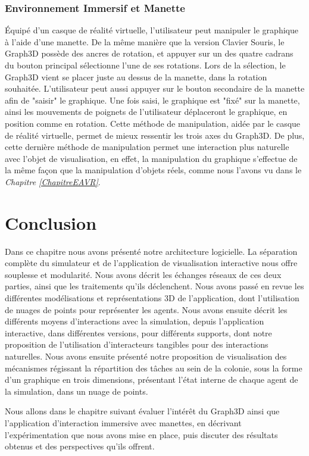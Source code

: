 		\subsubsection{Environnement Immersif et Manette}
		Équipé d'un casque de réalité virtuelle, l'utilisateur peut manipuler le graphique à l'aide d'une manette. De la même manière que la version Clavier Souris, le Graph3D possède des ancres de rotation, et appuyer sur un des quatre cadrans du bouton principal sélectionne l'une de ses rotations. Lors de la sélection, le Graph3D vient se placer juste au dessus de la manette, dans la rotation souhaitée. L'utilisateur peut aussi appuyer sur le bouton secondaire de la manette afin de "saisir" le graphique. Une fois saisi, le graphique est "fixé" sur la manette, ainsi les mouvements de poignets de l'utilisateur déplaceront le graphique, en position comme en rotation. Cette méthode de manipulation, aidée par le casque de réalité virtuelle, permet de mieux ressentir les trois axes du Graph3D. De plus, cette dernière méthode de manipulation permet une interaction plus naturelle avec l'objet de visualisation, en effet, la manipulation du graphique s'effectue de la même façon que la manipulation d'objets réels, comme nous l'avons vu dans le \textit{Chapitre \ref{ChapitreEAVR}}.
		
	
	
			
	\section*{Conclusion}
	Dans ce chapitre nous avons présenté notre architecture logicielle. La séparation complète du simulateur et de l'application de visualisation interactive nous offre souplesse et modularité. Nous avons décrit les échanges réseaux de ces deux parties, ainsi que les traitements qu'ils déclenchent. Nous avons passé en revue les différentes modélisations et représentations 3D de l'application, dont l'utilisation de nuages de points pour représenter les agents. Nous avons ensuite décrit les différents moyens d'interactions avec la simulation, depuis l'application interactive, dans différentes versions, pour différents supports, dont notre proposition de l'utilisation d'interacteurs tangibles pour des interactions naturelles.
	Nous avons ensuite présenté notre proposition de visualisation des mécanismes régissant la répartition des tâches au sein de la colonie, sous la forme d'un graphique en trois dimensions, présentant l'état interne de chaque agent de la simulation, dans un nuage de points.
	
	 Nous allons dans le chapitre suivant évaluer l'intérêt du Graph3D ainsi que l'application d'interaction immersive avec manettes, en décrivant l'expérimentation que nous avons mise en place, puis discuter des résultats obtenus et des perspectives qu'ils offrent.
	